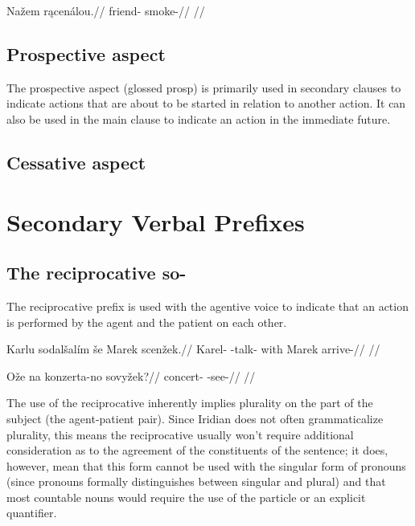 \pex
\begingl
\gla Na\v{z}em r\k{a}cen\'alou.//
\glb friend- smoke-//
\glft {} //
\endgl
\xe

\subsection{Prospective aspect}
\par The prospective aspect (glossed {\sc prosp}) is primarily used in secondary clauses to indicate actions that are about to be started in relation to another action. It can also be used in the main clause to indicate an action in the immediate future.

\subsection{Cessative aspect}




\section{Secondary Verbal Prefixes}

\subsection{The reciprocative so-}
The reciprocative prefix  is used with the agentive voice to indicate that an action is performed by the agent and the patient on each other.

\pex
\begingl
\gla Karlu sodal\v{s}al\'im \v{s}e Marek scen\v{z}ek.//
\glb Karel- -talk- with Marek arrive-//
\glft {}//
\endgl
\xe

\pex
\begingl
\gla O\v{z}e na konzerta-no sovy\v{z}ek?//
\glb {}  concert- -see-//
\glft {}//
\endgl
\xe

The use of the reciprocative inherently implies plurality on the part of the subject (the agent-patient pair). Since Iridian does not often grammaticalize plurality, this means the reciprocative usually won't require additional consideration as to the agreement of the constituents of the sentence; it does, however, mean that this form cannot be used with the singular form of pronouns (since pronouns formally distinguishes between singular and plural) and that most countable nouns would require the use of the particle  or an explicit quantifier.

